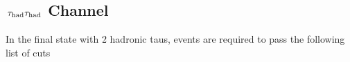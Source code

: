 \subsection{\texorpdfstring{$\,\tau_{\rm had}\tau_{\rm had}$ Channel}{tau-tau Channel}}
\label{sect:tauTauCuts}
In the final state with 2 hadronic taus, events are required to pass the following list of cuts
